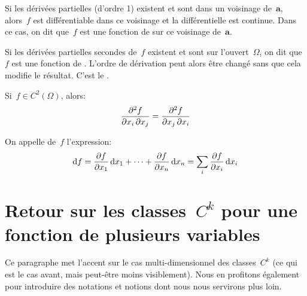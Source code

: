 \medskip
Si  les dérivées partielles (d'ordre 1) existent et sont  dans un voisinage de~$\mathbf{a}$, alors~$f$ est différentiable dans ce voisinage et la différentielle est continue. Dans ce cas, on dit que~$f$ est une fonction de  sur ce voisinage de~$\mathbf{a}$.

Si  les dérivées partielles secondes de~$f$ existent et sont  sur l'ouvert~$\Omega$, on dit que~$f$ est une fonction de .
L'ordre de dérivation peut alors être changé sans que cela modifie le résultat.
C'est le  .
\begin{theoreme}
Si~$f\in C^2(\Omega)$, alors:
\begin{equation}\colorred
  \frac{\partial^2f}{\partial x_i\, \partial x_j} = \frac{\partial^2f} {\partial x_j\, \partial x_i}
\end{equation}
\end{theoreme}

\begin{definition}
On appelle  de~$f$ l'expression:
\begin{equation}
  \text{d} f=\frac{\partial f}{\partial x_1}\,\text{d} x_1+\cdots+\frac{\partial f}{\partial x_n}\,\text{d} x_n
=  \displaystyle\sum_i \frac{\partial f}{\partial x_i}\,\text{d} x_i
\end{equation}
\end{definition}

\medskip
\section{Retour sur les classes~$C^k$ pour une fonction de plusieurs variables}

Ce paragraphe met l'accent sur le cas multi-dimensionnel des classes~$C^k$ (ce qui est le cas avant, mais peut-être moins visiblement). Nous en profitons également pour introduire des notations et notions dont nous nous servirons plus loin.

